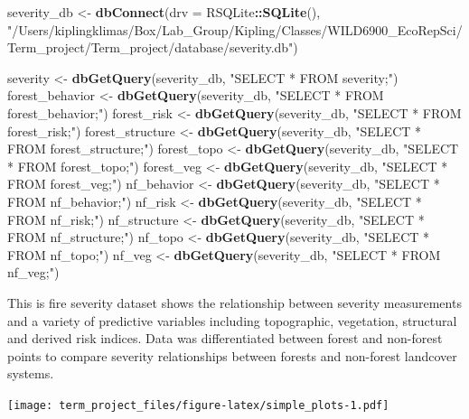 \documentclass[]{book}
\newenvironment{Shaded}{\begin{snugshade}}{\end{snugshade}}
\newcommand{\DataTypeTok}[1]{\textcolor[rgb]{0.13,0.29,0.53}{#1}}
\newcommand{\KeywordTok}[1]{\textcolor[rgb]{0.13,0.29,0.53}{\textbf{#1}}}
\newcommand{\NormalTok}[1]{#1}
\newcommand{\OperatorTok}[1]{\textcolor[rgb]{0.81,0.36,0.00}{\textbf{#1}}}
\newcommand{\StringTok}[1]{\textcolor[rgb]{0.31,0.60,0.02}{#1}}
\begin{document}
\begin{Shaded}
\begin{Highlighting}[]
\NormalTok{severity_db <-}\StringTok{ }\KeywordTok{dbConnect}\NormalTok{(}\DataTypeTok{drv =}\NormalTok{ RSQLite}\OperatorTok{::}\KeywordTok{SQLite}\NormalTok{(),}
                \StringTok{"/Users/kiplingklimas/Box/Lab_Group/Kipling/Classes/WILD6900_EcoRepSci/Term_project/Term_project/database/severity.db"}\NormalTok{)}

\NormalTok{severity <-}\StringTok{ }\KeywordTok{dbGetQuery}\NormalTok{(severity_db, }\StringTok{"SELECT * FROM severity;"}\NormalTok{)}
\NormalTok{forest_behavior <-}\StringTok{ }\KeywordTok{dbGetQuery}\NormalTok{(severity_db, }\StringTok{"SELECT * FROM forest_behavior;"}\NormalTok{)}
\NormalTok{forest_risk <-}\StringTok{ }\KeywordTok{dbGetQuery}\NormalTok{(severity_db, }\StringTok{"SELECT * FROM forest_risk;"}\NormalTok{)}
\NormalTok{forest_structure <-}\StringTok{ }\KeywordTok{dbGetQuery}\NormalTok{(severity_db, }\StringTok{"SELECT * FROM forest_structure;"}\NormalTok{)}
\NormalTok{forest_topo <-}\StringTok{ }\KeywordTok{dbGetQuery}\NormalTok{(severity_db, }\StringTok{"SELECT * FROM forest_topo;"}\NormalTok{)}
\NormalTok{forest_veg <-}\StringTok{ }\KeywordTok{dbGetQuery}\NormalTok{(severity_db, }\StringTok{"SELECT * FROM forest_veg;"}\NormalTok{)}
\NormalTok{nf_behavior <-}\StringTok{ }\KeywordTok{dbGetQuery}\NormalTok{(severity_db, }\StringTok{"SELECT * FROM nf_behavior;"}\NormalTok{)}
\NormalTok{nf_risk <-}\StringTok{ }\KeywordTok{dbGetQuery}\NormalTok{(severity_db, }\StringTok{"SELECT * FROM nf_risk;"}\NormalTok{)}
\NormalTok{nf_structure <-}\StringTok{ }\KeywordTok{dbGetQuery}\NormalTok{(severity_db, }\StringTok{"SELECT * FROM nf_structure;"}\NormalTok{)}
\NormalTok{nf_topo <-}\StringTok{ }\KeywordTok{dbGetQuery}\NormalTok{(severity_db, }\StringTok{"SELECT * FROM nf_topo;"}\NormalTok{)}
\NormalTok{nf_veg <-}\StringTok{ }\KeywordTok{dbGetQuery}\NormalTok{(severity_db, }\StringTok{"SELECT * FROM nf_veg;"}\NormalTok{)}
\end{Highlighting}
\end{Shaded}

This is fire severity dataset shows the relationship between severity measurements and a variety of predictive variables
including topographic, vegetation, structural and derived risk indices.
Data was differentiated between forest and non-forest points to compare severity relationships between forests and non-forest
landcover systems.

\begin{Shaded}
\end{Shaded}

\texttt{[image: term\_project\_files/figure-latex/simple\_plots-1.pdf]}


\end{document}
